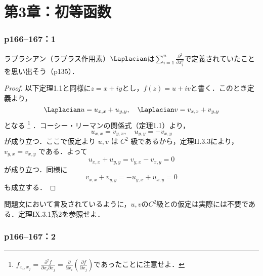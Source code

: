 \part*{第3章：初等函数}

\section*{p166--167：1}\label{p166--167：1}

ラプラシアン（ラプラス作用素）$\Laplacian$は$\sum_{i=1}^n \frac{\partial^2}{\partial x_i^2}$で定義されていたことを思い出そう（p135）．

\begin{tleftbar}
    \begin{proof}
        以下定理1.1と同様に$z = x + iy$とし，$f(z) = u + iv$と書く．このとき定義より，
        \[
            \Laplacian u = u_{x, x} + u_{y, y},
            \quad \Laplacian v = v_{x, x} + v_{y,y}
        \]
        となる%
        \footnote{%
            $f_{x_i, x_j} = \frac{\partial^2 f}{\partial x_i \partial x_j} = \frac{\partial}{\partial x_i} \left(\frac{\partial f}{\partial x_j} \right)$であったことに注意せよ．%
        }%
        ．コーシー・リーマンの関係式（定理1.1）より，
        \[
            u_{x, x} = v_{y, x}, \quad u_{y, y} = -v_{x, y}
        \]
        が成り立つ．ここで仮定より $u, v$ は $C^2$ 級であるから，定理II.3.3により，$v_{y, x} = v_{x, y}$ である．よって
        \[
            u_{x, x} + u_{y, y} = v_{y, x} - v_{x, y} = 0
        \]
        が成り立つ．同様に
        \[
            v_{x, x} + v_{y, y} = -u_{y, x} + u_{x, y} = 0
        \]
        も成立する．
    \end{proof}
\end{tleftbar}

問題文において言及されているように，$u, v$の$C^2$級との仮定は実際には不要である．定理IX.3.1系2を参照せよ．


\section*{p166--167：2}\label{p166--167：2}

